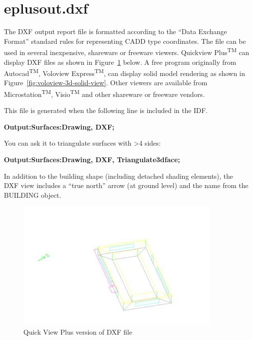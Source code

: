 \section{eplusout.dxf}\label{eplusout.dxf}

The DXF output report file is formatted according to the ``Data Exchange Format'' standard rules for representing CADD type coordinates. The file can be used in several inexpensive, shareware or freeware viewers. Quickview Plus\textsuperscript{TM} can display DXF files as shown in Figure~\ref{fig:quick-view-plus-version-of-dxf-file} below. A free program originally from Autocad\textsuperscript{TM}, Voloview Express\textsuperscript{TM}, can display solid model rendering as shown in Figure~\ref{fig:voloview-3d-solid-view}. Other viewers are available from Microstation\textsuperscript{TM}, Visio\textsuperscript{TM} and other shareware or freeware vendors.

This file is generated when the following line is included in the IDF.

\textbf{Output:Surfaces:Drawing, DXF;}

You can ask it to triangulate surfaces with \textgreater{}4 sides:

\textbf{Output:Surfaces:Drawing, DXF, Triangulate3dface;}

In addition to the building shape (including detached shading elements), the DXF view includes a ``true north'' arrow (at ground level) and the name from the BUILDING object.

\begin{figure}[hbtp] %
\centering
\includegraphics[width=0.9\textwidth, height=0.9\textheight, keepaspectratio=true]{media/image001.jpg}
\caption{Quick View Plus version of DXF file \protect \label{fig:quick-view-plus-version-of-dxf-file}}
\end{figure}

